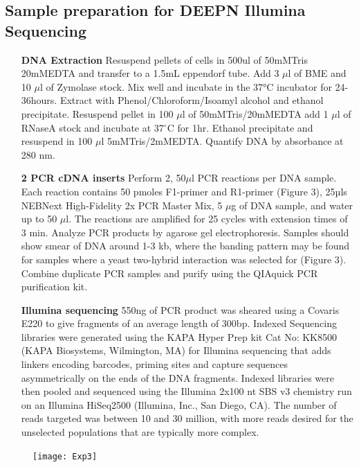 \documentclass[11pt,fleqn]{book} %
\begin{document}
\subsection{Sample preparation for DEEPN Illumina Sequencing}

\begin{enumerate}[leftmargin=1.4in]
    \item[\textbf{DNA Extraction}] Resuspend pellets of cells in 500ul of 50mMTris 20mMEDTA and transfer to a 1.5mL eppendorf tube. Add 3 $\mu$l of BME and 10 $\mu$l of Zymolase stock.  Mix well and incubate in the 37°C incubator for 24-36hours.  Extract with Phenol/Chloroform/Isoamyl alcohol and ethanol precipitate.  Resuspend pellet in 100 $\mu$l of 50mMTris/20mMEDTA add 1 $\mu$l of RNaseA stock and incubate at 37$^\circ$C for 1hr. Ethanol precipitate and resuspend in 100 $\mu$l 5mMTris/2mMEDTA.  Quantify DNA by absorbance at 280 nm.  
    \item[\textbf{2 PCR cDNA inserts}] Perform 2, 50$\mu$l PCR reactions per DNA sample.  Each reaction contains 50 pmoles F1-primer and R1-primer (Figure 3), 25µls NEBNext High-Fidelity 2x PCR Master Mix, 5 $\mu$g of DNA sample, and water up to 50 $\mu$l. The reactions are amplified for 25 cycles with extension times of 3 min. Analyze PCR products by agarose gel electrophoresis.  Samples should show smear of DNA around 1-3 kb, where the banding pattern may be found for samples where a yeast two-hybrid interaction was selected for (Figure 3).  Combine duplicate PCR samples and purify using the QIAquick PCR purification kit.  
    \item[\textbf{Illumina sequencing}] 550ng of PCR product was sheared using a Covaris E220 to give fragments of an average length of 300bp. Indexed Sequencing libraries were generated using the KAPA Hyper Prep kit Cat No: KK8500 (KAPA Biosystems, Wilmington, MA) for Illumina sequencing that adds linkers encoding barcodes, priming sites and capture sequences asymmetrically on the ends of the DNA fragments. Indexed libraries were then pooled and sequenced using the Illumina 2x100 nt SBS v3 chemistry run on an Illumina HiSeq2500 (Illumina, Inc., San Diego, CA). The number of reads targeted was between 10 and 30 million, with more reads desired for the unselected populations that are typically more complex.
\end{enumerate}

\begin{figure}[!ht]
    \centering
    \texttt{[image: Exp3]}
    \caption{}
    \label{fig:exp_fig3}
\end{figure}
\end{document}

